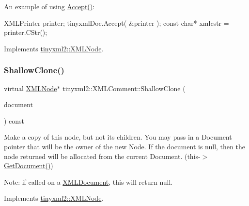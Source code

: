 An example of using \mbox{\hyperlink{classtinyxml2_1_1XMLComment_a4a33dc32fae0285b03f9cfcb3e43e122}{Accept()}}\+: \begin{DoxyVerb}XMLPrinter printer;
tinyxmlDoc.Accept( &printer );
const char* xmlcstr = printer.CStr();
\end{DoxyVerb}
 

Implements \mbox{\hyperlink{classtinyxml2_1_1XMLNode_a81e66df0a44c67a7af17f3b77a152785}{tinyxml2\+::\+X\+M\+L\+Node}}.

\mbox{\label{classtinyxml2_1_1XMLComment_a08991cc63fadf7e95078ac4f9ea1b073}} 
\subsubsection{\texorpdfstring{ShallowClone()}{ShallowClone()}}
{\footnotesize\ttfamily virtual \mbox{\hyperlink{classtinyxml2_1_1XMLNode}{X\+M\+L\+Node}}$\ast$ tinyxml2\+::\+X\+M\+L\+Comment\+::\+Shallow\+Clone (\begin{DoxyParamCaption}\item[{\mbox{\hyperlink{classtinyxml2_1_1XMLDocument}{X\+M\+L\+Document}} $\ast$}]{document }\end{DoxyParamCaption}) const\hspace{0.3cm}{\ttfamily [virtual]}}

Make a copy of this node, but not its children. You may pass in a Document pointer that will be the owner of the new Node. If the \textquotesingle{}document\textquotesingle{} is null, then the node returned will be allocated from the current Document. (this-\/$>$\mbox{\hyperlink{classtinyxml2_1_1XMLNode_af343d1ef0b45c0020e62d784d7e67a68}{Get\+Document()}})

Note\+: if called on a \mbox{\hyperlink{classtinyxml2_1_1XMLDocument}{X\+M\+L\+Document}}, this will return null. 

Implements \mbox{\hyperlink{classtinyxml2_1_1XMLNode_a8402cbd3129d20e9e6024bbcc0531283}{tinyxml2\+::\+X\+M\+L\+Node}}.

\mbox{\label{classtinyxml2_1_1XMLComment_a6f7d227b25afa8cc3c763b7cc8833739}} 
